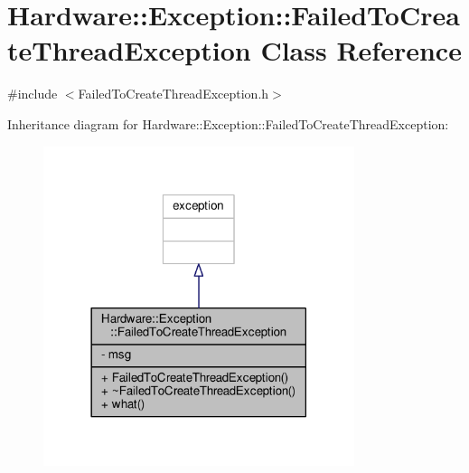 \hypertarget{class_hardware_1_1_exception_1_1_failed_to_create_thread_exception}{}\section{Hardware\+:\+:Exception\+:\+:Failed\+To\+Create\+Thread\+Exception Class Reference}
\label{class_hardware_1_1_exception_1_1_failed_to_create_thread_exception}


{\ttfamily \#include $<$Failed\+To\+Create\+Thread\+Exception.\+h$>$}



Inheritance diagram for Hardware\+:\+:Exception\+:\+:Failed\+To\+Create\+Thread\+Exception\+:\nopagebreak
\begin{figure}[H]
\begin{center}
\leavevmode
\includegraphics[width=258pt]{class_hardware_1_1_exception_1_1_failed_to_create_thread_exception__inherit__graph}
\end{center}
\end{figure}


